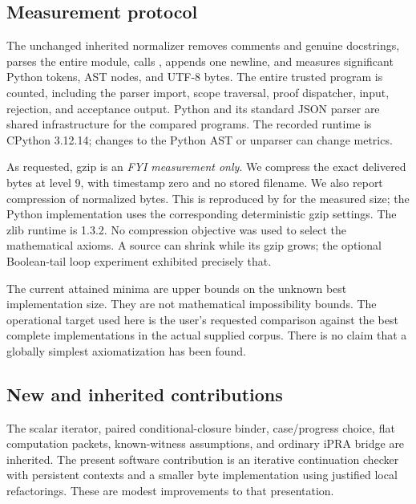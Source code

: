 \subsection{Measurement protocol}

The unchanged inherited normalizer removes comments and genuine
docstrings, parses the entire module, calls , appends
one newline, and measures significant Python tokens, AST nodes, and
UTF-8 bytes. The entire trusted program is counted, including the
parser import, scope traversal, proof dispatcher, input, rejection, and
acceptance output. Python and its standard JSON parser are shared
infrastructure for the compared programs. The recorded runtime is
CPython 3.12.14; changes to the Python AST or unparser can change metrics.

As requested, gzip is an \emph{FYI measurement only}. We compress the
exact delivered bytes at level 9, with timestamp zero and no stored
filename. We also report compression of normalized bytes. This is
reproduced by  for the measured size; the Python
implementation uses the corresponding deterministic gzip settings.
The zlib runtime is 1.3.2. No compression objective was used to select
the mathematical axioms. A source can shrink while its gzip grows;
the optional Boolean-tail loop experiment exhibited precisely that.

The current attained minima are upper bounds on the unknown best
implementation size. They are not mathematical impossibility bounds.
The operational target used here is the user's requested comparison
against the best complete implementations in the actual supplied corpus.
There is no claim that a globally simplest axiomatization has been found.

\subsection{New and inherited contributions}

The scalar iterator, paired conditional-closure binder, case/progress
choice, flat computation packets, known-witness assumptions, and ordinary
iPRA bridge are inherited. The present software contribution is an
iterative continuation checker with persistent contexts and a smaller
byte implementation using justified local refactorings. These are
modest improvements to that presentation.

